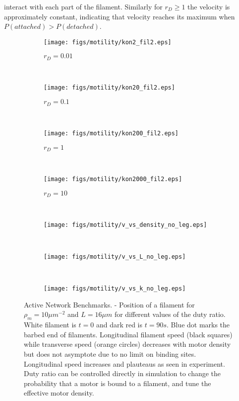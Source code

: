 \documentclass[12pt]{article}
\begin{document}
interact with each part of the filament. Similarly for $r_D\ge1$ the velocity is approximately constant, indicating that
velocity reaches its maximum when $P(attached) > P(detached)$.
\begin{figure}[H] 
  \begin{subfigure}{0.2\textwidth}
    \centering
    \caption{\label{fig:xt}$r_D = 0.01$}
    \texttt{[image: figs/motility/kon2\_fil2.eps]}
  \end{subfigure}
  ~
  \begin{subfigure}{0.2\textwidth}
    \centering
    \caption{$r_D = 0.1$}
    \texttt{[image: figs/motility/kon20\_fil2.eps]}
  \end{subfigure}
  ~
  \begin{subfigure}{0.2\textwidth}
    \centering
    \caption{$r_D = 1$}
    \texttt{[image: figs/motility/kon200\_fil2.eps]}
  \end{subfigure}
  ~
  \begin{subfigure}{0.2\textwidth}
    \centering
    \caption{\label{fig:xthi}$r_D = 10$}
    \texttt{[image: figs/motility/kon2000\_fil2.eps]}
  \end{subfigure}
  ~
  \begin{subfigure}{0.33\textwidth}
    \centering
    \texttt{[image: figs/motility/v\_vs\_density\_no\_leg.eps]}
    \caption{\label{fig:v_vs_dens}}
  \end{subfigure}
  ~
  \begin{subfigure}{0.33\textwidth}
    \centering
    \texttt{[image: figs/motility/v\_vs\_L\_no\_leg.eps]}
    \caption{\label{fig:v_vs_len}}
  \end{subfigure}
  ~
  \begin{subfigure}{0.3\textwidth}
    \centering
    \texttt{[image: figs/motility/v\_vs\_k\_no\_leg.eps]}
    \caption{\label{fig:v_vs_k}}
  \end{subfigure}
  \caption{%
  \label{fig:motility}%
  Active Network Benchmarks. - Position of a filament for $\rho_m = 10\mu m^{-2}$ and $L = 16\mu m$ for
  different values of the duty ratio. White filament is $t=0$ and dark red is $t=90s$. Blue dot marks the barbed end of filaments.  
   Longitudinal filament speed (black squares) while transverse speed (orange circles) decreases with motor density 
  but does not asymptote due to no limit on binding sites.  Longitudinal speed increases and
  plauteaus as seen in experiment.  Duty ratio can be controlled directly in simulation to change the
  probability that a motor is bound to a filament, and tune the effective motor density. 
    }
\end{figure}
 
\end{document}
